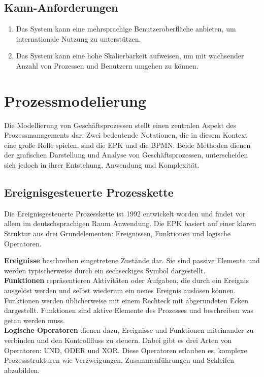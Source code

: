 \subsection*{Kann-Anforderungen}
\begin{enumerate}[label=\textbf{NK\arabic*.}]
    \item Das System kann eine mehrsprachige Benutzeroberfläche anbieten, um internationale Nutzung zu unterstützen.
    \item Das System kann eine hohe Skalierbarkeit aufweisen, um mit wachsender Anzahl von Prozessen und Benutzern umgehen zu können.
\end{enumerate}

\newpage
\section{Prozessmodelierung}
Die Modellierung von Geschäftsprozessen stellt einen zentralen Aspekt des Prozessmanagements dar. Zwei bedeutende Notationen, die in diesem Kontext eine große Rolle spielen, sind die \ac{EPK} und die \ac{BPMN}. Beide Methoden dienen der grafischen Darstellung und Analyse von Geschäftsprozessen, unterscheiden sich jedoch in ihrer Entstehung, Anwendung und Komplexität.

\subsection{Ereignisgesteuerte Prozesskette}
Die Ereignisgesteuerte Prozesskette ist 1992 entwickelt worden und findet vor allem im deutschsprachigen Raum Anwendung. 
Die \ac{EPK} basiert auf einer klaren Struktur aus drei Grundelementen: Ereignissen, Funktionen und logische Operatoren.

\textbf{Ereignisse} beschreiben eingetretene Zustände dar. Sie sind passive Elemente und werden typischerweise durch ein sechseckiges Symbol dargestellt.\\
\textbf{Funktionen} repräsentieren Aktivitäten oder Aufgaben, die durch ein Ereignis ausgelöst werden und selbst wiederum ein neues Ereignis auslösen können. Funktionen werden üblicherweise mit einem Rechteck mit abgerundeten Ecken dargestellt. Funktionen sind aktive Elemente des Prozesses und beschreiben was getan werden muss. \\
\textbf{Logische Operatoren} dienen dazu, Ereignisse und Funktionen miteinander zu verbinden und den Kontrollfluss zu steuern. Dabei gibt es drei Arten von Operatoren: UND, ODER und \ac{XOR}. Diese Operatoren erlauben es, komplexe Prozessstrukturen wie Verzweigungen, Zusammenführungen und Schleifen abzubilden.

